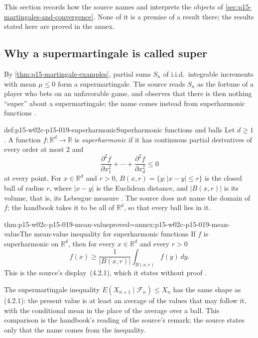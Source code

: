 This section records how the source names and interprets the objects of
\cref{sec:p15-martingales-and-convergence}. None of it is a premise of a
result there; the results stated here are proved in the annex.

\subsection*{Why a supermartingale is called super}

By \cref{thm:p15-martingale-examples}, partial sums \(S_n\) of
i.i.d.\ integrable increments with mean \(\mu\leq0\) form a
supermartingale. The source reads \(S_n\) as the fortune of a player
who bets on an unfavorable game, and observes that there is then nothing
``super'' about a supermartingale; the name comes instead from
superharmonic functions \cite[p.~217]{DurrettPTEAuthor2019}.

\begin{hbdefinition}{def:p15-w02c-p15-019-superharmonic}{Superharmonic functions and balls}
Let \(d\geq1\). A function \(f:\mathbb R^d\to\mathbb R\) is
\emph{superharmonic} if it has continuous partial derivatives of every
order at most \(2\) and
\[
   \frac{\partial^2f}{\partial x_1^2}+\cdots+\frac{\partial^2f}{\partial x_d^2}\leq0
\]
at every point. For \(x\in\mathbb R^d\) and \(r>0\),
\(B(x,r)=\{y:|x-y|\leq r\}\) is the closed ball of radius \(r\), where
\(|x-y|\) is the Euclidean distance, and \(|B(x,r)|\) is its volume,
that is, its Lebesgue measure \cite[pp.~217--218]{DurrettPTEAuthor2019}.
The source does not name the domain of \(f\); the handbook takes it to
be all of \(\mathbb R^d\), so that every ball lies in it.
\end{hbdefinition}

\begin{hbtheorem}{thm:p15-w02c-p15-019-mean-value}{proved=annex:p15-w02c-p15-019-mean-value}{The mean-value inequality for superharmonic functions}
If \(f\) is superharmonic on \(\mathbb R^d\), then for every
\(x\in\mathbb R^d\) and every \(r>0\)
\[
        f(x)\geq\frac1{|B(x,r)|}\int_{B(x,r)}f(y)\,dy .
\]
This is the source's display~(4.2.1), which it states without proof
\cite[p.~217, eq.~(4.2.1)]{DurrettPTEAuthor2019}.
\end{hbtheorem}

The supermartingale inequality \(E(X_{n+1}\mid\mathcal F_n)\leq X_n\)
has the same shape as (4.2.1): the present value is at least an average
of the values that may follow it, with the conditional mean in the place
of the average over a ball. This comparison is the handbook's reading of
the source's remark; the source states only that the name comes from
the inequality.

